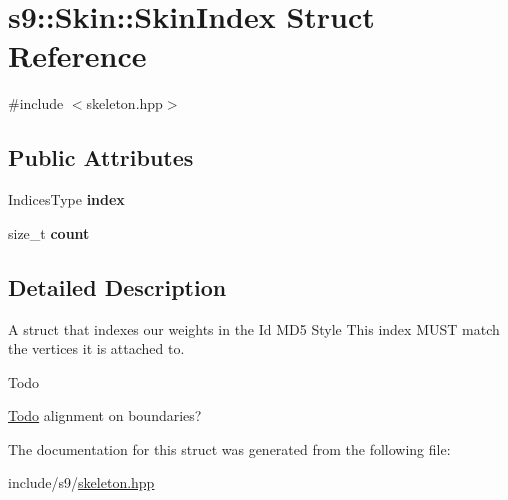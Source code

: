 \hypertarget{structs9_1_1Skin_1_1SkinIndex}{\section{s9\-:\-:Skin\-:\-:Skin\-Index Struct Reference}
\label{structs9_1_1Skin_1_1SkinIndex}
}


{\ttfamily \#include $<$skeleton.\-hpp$>$}

\subsection*{Public Attributes}
\begin{DoxyCompactItemize}
\item 
\hypertarget{structs9_1_1Skin_1_1SkinIndex_a32050082a692e293f73373f44a12ac8c}{Indices\-Type {\bfseries index}}\label{structs9_1_1Skin_1_1SkinIndex_a32050082a692e293f73373f44a12ac8c}

\item 
\hypertarget{structs9_1_1Skin_1_1SkinIndex_a7f59a8544697f46529bc487e6e0ae6ec}{size\-\_\-t {\bfseries count}}\label{structs9_1_1Skin_1_1SkinIndex_a7f59a8544697f46529bc487e6e0ae6ec}

\end{DoxyCompactItemize}


\subsection{Detailed Description}
A struct that indexes our weights in the Id M\-D5 Style This index M\-U\-S\-T match the vertices it is attached to. \begin{DoxyRefDesc}{Todo}
\item[\hyperlink{todo__todo000041}{Todo}]alignment on boundaries? \end{DoxyRefDesc}


The documentation for this struct was generated from the following file\-:\begin{DoxyCompactItemize}
\item 
include/s9/\hyperlink{skeleton_8hpp}{skeleton.\-hpp}\end{DoxyCompactItemize}
